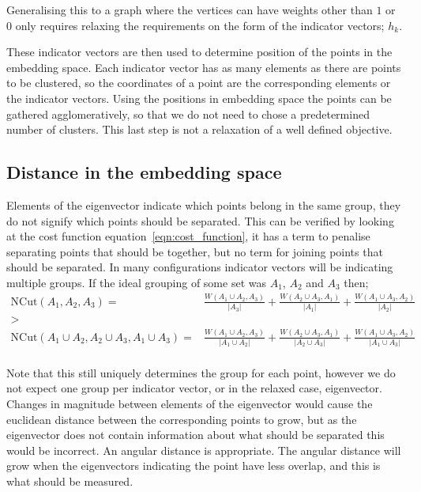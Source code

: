 Generalising this to a graph where the vertices can have weights other than \(1\) or \(0\)
only requires relaxing the requirements on the form of the indicator vectors; \(h_k\).

These indicator vectors are then used to determine position of the points in the embedding space.
Each indicator vector has as many elements as there are points to be clustered,
so the coordinates of a point are the corresponding elements or the indicator vectors.
Using the positions in embedding space the points can be gathered agglomeratively,
so that we do not need to chose a predetermined number of clusters.
This last step is not a relaxation of a well defined objective.

\subsection{Distance in the embedding space}\label{sec:embedding_distance}
Elements of the eigenvector indicate which points belong in the same group,
they do not signify which points should be separated.
This can be verified by looking at the cost function equation~\ref{eqn:cost_function},
it has a term to penalise separating points that should be together, 
but no term for joining points that should be separated.
In many configurations indicator vectors will be indicating multiple groups.
If the ideal grouping of some set was \(A_1\), \(A_2\) and \(A_3\)
then;
\begin{equation}
\begin{aligned}
    \text{NCut}(A_1, A_2, A_3) = &
    \frac{W(A_1\cup A_2, A_3)}{|A_3|} + \frac{W(A_2\cup A_3, A_1)}{|A_1|} + \frac{W(A_1\cup A_3, A_2)}{|A_2|} \\
    >& \\
    \text{NCut}(A_1\cup A_2, A_2\cup A_3, A_1\cup A_3) =&
    \frac{W(A_1\cup A_2, A_3)}{|A_1\cup A_2|} + \frac{W(A_2\cup A_3, A_1)}{|A_2\cup A_3|} + \frac{W(A_1\cup A_3, A_2)}{|A_1\cup A_3|} \\
\end{aligned}
\end{equation}

Note that this still uniquely determines the group for each point,
however we do not expect one group per indicator vector, 
or in the relaxed case, eigenvector.
Changes in magnitude between elements of the eigenvector would cause the euclidean distance between the corresponding points to grow,
but as the eigenvector does not contain information about what should be separated this would be incorrect.
An angular distance is appropriate. 
The angular distance will grow when the eigenvectors indicating the point have less overlap,
and this is what should be measured.

